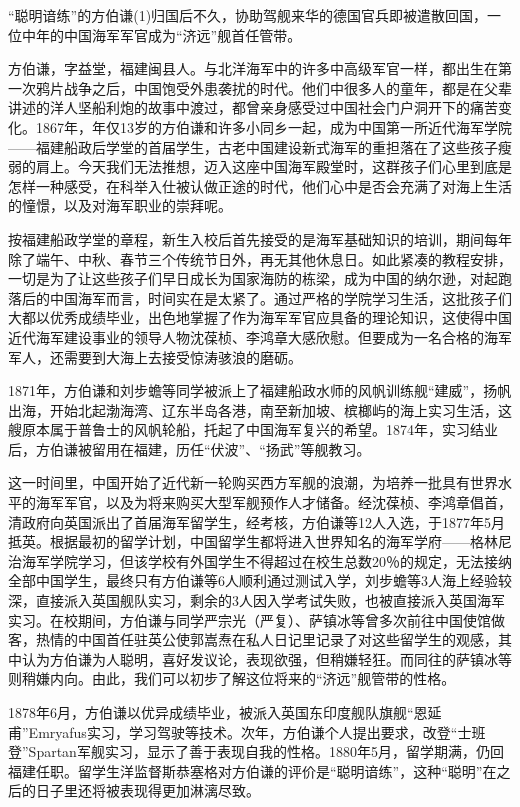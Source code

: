 \documentclass[12pt,UTF8]{ctexbook}
\begin{document}
“聪明谙练”的方伯谦(1)归国后不久，协助驾舰来华的德国官兵即被遣散回国，一位中年的中国海军军官成为“济远”舰首任管带。

方伯谦，字益堂，福建闽县人。与北洋海军中的许多中高级军官一样，都出生在第一次鸦片战争之后，中国饱受外患袭扰的时代。他们中很多人的童年，都是在父辈讲述的洋人坚船利炮的故事中渡过，都曾亲身感受过中国社会门户洞开下的痛苦变化。1867年，年仅13岁的方伯谦和许多小同乡一起，成为中国第一所近代海军学院——福建船政后学堂的首届学生，古老中国建设新式海军的重担落在了这些孩子瘦弱的肩上。今天我们无法推想，迈入这座中国海军殿堂时，这群孩子们心里到底是怎样一种感受，在科举入仕被认做正途的时代，他们心中是否会充满了对海上生活的憧憬，以及对海军职业的崇拜呢。

按福建船政学堂的章程，新生入校后首先接受的是海军基础知识的培训，期间每年除了端午、中秋、春节三个传统节日外，再无其他休息日。如此紧凑的教程安排，一切是为了让这些孩子们早日成长为国家海防的栋梁，成为中国的纳尔逊，对起跑落后的中国海军而言，时间实在是太紧了。通过严格的学院学习生活，这批孩子们大都以优秀成绩毕业，出色地掌握了作为海军军官应具备的理论知识，这使得中国近代海军建设事业的领导人物沈葆桢、李鸿章大感欣慰。但要成为一名合格的海军军人，还需要到大海上去接受惊涛骇浪的磨砺。

1871年，方伯谦和刘步蟾等同学被派上了福建船政水师的风帆训练舰“建威”，扬帆出海，开始北起渤海湾、辽东半岛各港，南至新加坡、槟榔屿的海上实习生活，这艘原本属于普鲁士的风帆轮船，托起了中国海军复兴的希望。1874年，实习结业后，方伯谦被留用在福建，历任“伏波”、“扬武”等舰教习。

这一时间里，中国开始了近代新一轮购买西方军舰的浪潮，为培养一批具有世界水平的海军军官，以及为将来购买大型军舰预作人才储备。经沈葆桢、李鸿章倡首，清政府向英国派出了首届海军留学生，经考核，方伯谦等12人入选，于1877年5月抵英。根据最初的留学计划，中国留学生都将进入世界知名的海军学府——格林尼治海军学院学习，但该学校有外国学生不得超过在校生总数20％的规定，无法接纳全部中国学生，最终只有方伯谦等6人顺利通过测试入学，刘步蟾等3人海上经验较深，直接派入英国舰队实习，剩余的3人因入学考试失败，也被直接派入英国海军实习。在校期间，方伯谦与同学严宗光（严复）、萨镇冰等曾多次前往中国使馆做客，热情的中国首任驻英公使郭嵩焘在私人日记里记录了对这些留学生的观感，其中认为方伯谦为人聪明，喜好发议论，表现欲强，但稍嫌轻狂。而同往的萨镇冰等则稍嫌内向。由此，我们可以初步了解这位将来的“济远”舰管带的性格。

1878年6月，方伯谦以优异成绩毕业，被派入英国东印度舰队旗舰“恩延甫”Emryafus实习，学习驾驶等技术。次年，方伯谦个人提出要求，改登“士班登”Spartan军舰实习，显示了善于表现自我的性格。1880年5月，留学期满，仍回福建任职。留学生洋监督斯恭塞格对方伯谦的评价是“聪明谙练”，这种“聪明”在之后的日子里还将被表现得更加淋漓尽致。
\end{document}
